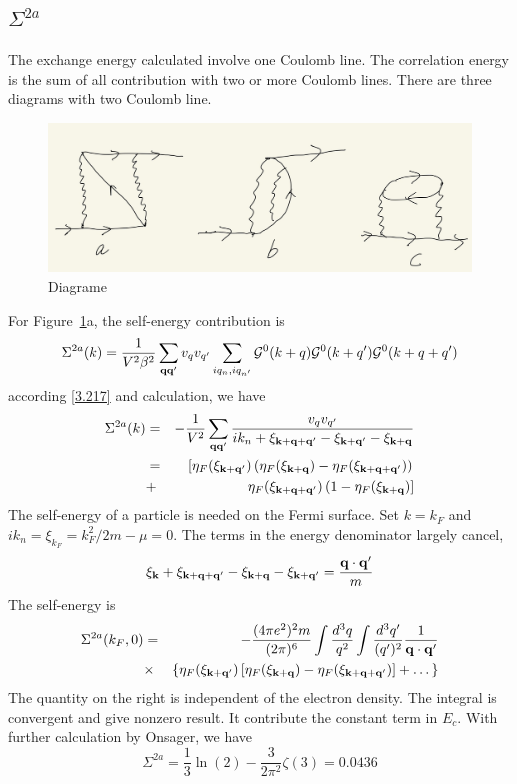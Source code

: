 \subsection{$\Sigma^{2a}$}
The exchange energy calculated involve one Coulomb line.
The correlation energy is the sum of all contribution with two or more Coulomb lines.
There are three diagrams with two Coulomb line.
\begin{figure}[ht]
    \centering
    \includegraphics[width=0.8\linewidth]{./fig/fig5-2.jpg}
    \caption{Diagrame}%
    \label{fig:5.2}
\end{figure}

For Figure~\ref{fig:5.2}a, the self-energy contribution is
\begin{equation}
    \Sigma^{2a}(k) = \frac{1}{V^2\beta^2} \sum_{\mathbf{q} \mathbf{q}'} v_q v_{q'} \sum_{iq_n,iq_{ n'}} \mathcal{G}^0(k+q) \mathcal{G}^0(k+q') \mathcal{G}^0(k+q+q')
\end{equation}
according \eqref{3.217} and calculation, we have
\begin{eqnarray}
    \Sigma^{2a}(k) &=& - \frac{1}{V^2} \sum_{\mathbf{q} \mathbf{q}'} \frac{v_q v_{q'}}{ik_n + \xi_{\mathbf{k}+\mathbf{q}+\mathbf{q}'} - \xi_{\mathbf{k}+\mathbf{q}'} -\xi_{\mathbf{k}+\mathbf{q}} } \nonumber \\
    &=& \left[ \eta_F(\xi_{\mathbf{k}+\mathbf{q}'}) \left( \eta_F(\xi_{\mathbf{k}+\mathbf{q}}) - \eta_F(\xi_{\mathbf{k}+\mathbf{q}+\mathbf{q}'})  \right) \right. \nonumber\\
    &+&\left. \eta_F(\xi_{\mathbf{k}+\mathbf{q}+\mathbf{q}'})\left( 1- \eta_F(\xi_{\mathbf{k}+\mathbf{q}} \right) \right]
\end{eqnarray}
The self-energy of a particle is needed on the Fermi surface.
Set $k=k_F$ and $ik_n = \xi_{k_F} =k_F^2/2m - \mu = 0$.
The terms in the energy denominator largely cancel,
\begin{equation}
    \xi_{\mathbf{k}} + \xi_{\mathbf{k}+\mathbf{q}+\mathbf{q}'} - \xi_{\mathbf{k}+\mathbf{q}} - \xi_{\mathbf{k}+ \mathbf{q}'} = \frac{\mathbf{q} \cdot \mathbf{q}'}{m}   \label{5.44}
\end{equation}
The self-energy is
\begin{eqnarray}
    \Sigma^{2a}(k_F,0) &=& - \frac{(4\pi e^2)^2 m}{(2\pi)^6} \int \frac{d^3 q}{q^2} \int \frac{d^3 q'}{(q')^2} \frac{1}{\mathbf{q} \cdot \mathbf{q}'} \nonumber \\
    &\times& \{ \eta_F(\xi_{\mathbf{k}+\mathbf{q}'}) \left[ \eta_F(\xi_{\mathbf{k}+\mathbf{q}}) - \eta_F(\xi_{\mathbf{k}+\mathbf{q}+\mathbf{q}'})  \right] + \dots  \} \label{5.45}
\end{eqnarray}
The quantity on the right is independent of the electron density.
The integral is convergent and give nonzero result.
It contribute the constant term in $E_c$.
With further calculation by Onsager, we have
\begin{equation}
    \Sigma^{2a} = \frac{1}{3} \ln(2) - \frac{3}{2\pi^2}  \zeta(3) = 0.0436
\end{equation}

